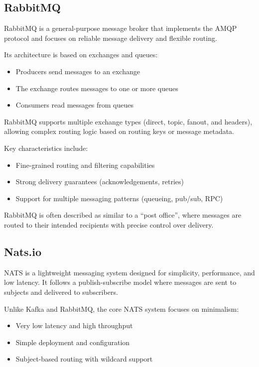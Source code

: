 \subsection{RabbitMQ}

RabbitMQ is a general-purpose message broker that implements the AMQP protocol and focuses on reliable message delivery and flexible routing.

Its architecture is based on exchanges and queues:
\begin{itemize}
    \item Producers send messages to an exchange
    \item The exchange routes messages to one or more queues
    \item Consumers read messages from queues
\end{itemize}

RabbitMQ supports multiple exchange types (direct, topic, fanout, and headers), allowing complex routing logic based on routing keys or message metadata.

Key characteristics include:
\begin{itemize}
    \item Fine-grained routing and filtering capabilities
    \item Strong delivery guarantees (acknowledgements, retries)
    \item Support for multiple messaging patterns (queueing, pub/sub, RPC)
\end{itemize}

RabbitMQ is often described as similar to a “post office”, where messages are routed to their intended recipients with precise control over delivery.

\subsection{Nats.io}

NATS is a lightweight messaging system designed for simplicity, performance, and low latency. It follows a publish-subscribe model where messages are sent to subjects and delivered to subscribers.

Unlike Kafka and RabbitMQ, the core NATS system focuses on minimalism:
\begin{itemize}
    \item Very low latency and high throughput
    \item Simple deployment and configuration
    \item Subject-based routing with wildcard support
\end{itemize}

